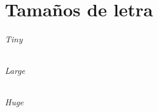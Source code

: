 \part{Tamaños de letra}
\paragraph{\tiny{Tiny}}
\tiny{\lipsum [4]}
\paragraph{\Large{Large}}
\Large{\lipsum [5]}
\paragraph{\Huge{Huge}}
\Huge{\lipsum [6]}